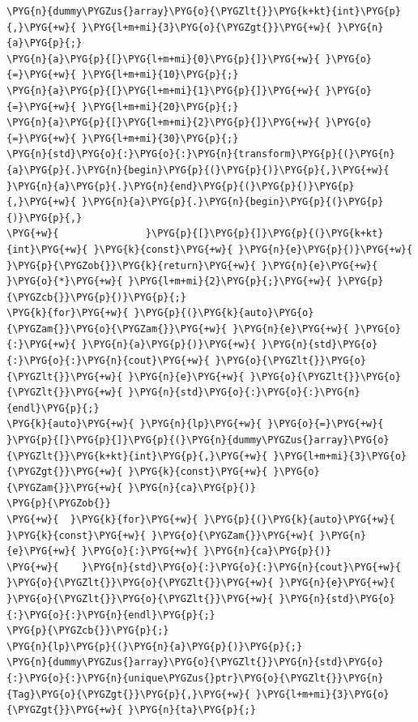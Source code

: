 \begin{codeblockbg}
\begin{Verbatim}[commandchars=\\\{\},breaklines=true,breakanywhere=true,fontsize=\codefont,xleftmargin=17bp]
\PYG{n}{dummy\PYGZus{}array}\PYG{o}{\PYGZlt{}}\PYG{k+kt}{int}\PYG{p}{,}\PYG{+w}{ }\PYG{l+m+mi}{3}\PYG{o}{\PYGZgt{}}\PYG{+w}{ }\PYG{n}{a}\PYG{p}{;}
\PYG{n}{a}\PYG{p}{[}\PYG{l+m+mi}{0}\PYG{p}{]}\PYG{+w}{ }\PYG{o}{=}\PYG{+w}{ }\PYG{l+m+mi}{10}\PYG{p}{;}
\PYG{n}{a}\PYG{p}{[}\PYG{l+m+mi}{1}\PYG{p}{]}\PYG{+w}{ }\PYG{o}{=}\PYG{+w}{ }\PYG{l+m+mi}{20}\PYG{p}{;}
\PYG{n}{a}\PYG{p}{[}\PYG{l+m+mi}{2}\PYG{p}{]}\PYG{+w}{ }\PYG{o}{=}\PYG{+w}{ }\PYG{l+m+mi}{30}\PYG{p}{;}
\PYG{n}{std}\PYG{o}{:}\PYG{o}{:}\PYG{n}{transform}\PYG{p}{(}\PYG{n}{a}\PYG{p}{.}\PYG{n}{begin}\PYG{p}{(}\PYG{p}{)}\PYG{p}{,}\PYG{+w}{ }\PYG{n}{a}\PYG{p}{.}\PYG{n}{end}\PYG{p}{(}\PYG{p}{)}\PYG{p}{,}\PYG{+w}{ }\PYG{n}{a}\PYG{p}{.}\PYG{n}{begin}\PYG{p}{(}\PYG{p}{)}\PYG{p}{,}
\PYG{+w}{               }\PYG{p}{[}\PYG{p}{]}\PYG{p}{(}\PYG{k+kt}{int}\PYG{+w}{ }\PYG{k}{const}\PYG{+w}{ }\PYG{n}{e}\PYG{p}{)}\PYG{+w}{ }\PYG{p}{\PYGZob{}}\PYG{k}{return}\PYG{+w}{ }\PYG{n}{e}\PYG{+w}{ }\PYG{o}{*}\PYG{+w}{ }\PYG{l+m+mi}{2}\PYG{p}{;}\PYG{+w}{ }\PYG{p}{\PYGZcb{}}\PYG{p}{)}\PYG{p}{;}
\PYG{k}{for}\PYG{+w}{ }\PYG{p}{(}\PYG{k}{auto}\PYG{o}{\PYGZam{}}\PYG{o}{\PYGZam{}}\PYG{+w}{ }\PYG{n}{e}\PYG{+w}{ }\PYG{o}{:}\PYG{+w}{ }\PYG{n}{a}\PYG{p}{)}\PYG{+w}{ }\PYG{n}{std}\PYG{o}{:}\PYG{o}{:}\PYG{n}{cout}\PYG{+w}{ }\PYG{o}{\PYGZlt{}}\PYG{o}{\PYGZlt{}}\PYG{+w}{ }\PYG{n}{e}\PYG{+w}{ }\PYG{o}{\PYGZlt{}}\PYG{o}{\PYGZlt{}}\PYG{+w}{ }\PYG{n}{std}\PYG{o}{:}\PYG{o}{:}\PYG{n}{endl}\PYG{p}{;}
\PYG{k}{auto}\PYG{+w}{ }\PYG{n}{lp}\PYG{+w}{ }\PYG{o}{=}\PYG{+w}{ }\PYG{p}{[}\PYG{p}{]}\PYG{p}{(}\PYG{n}{dummy\PYGZus{}array}\PYG{o}{\PYGZlt{}}\PYG{k+kt}{int}\PYG{p}{,}\PYG{+w}{ }\PYG{l+m+mi}{3}\PYG{o}{\PYGZgt{}}\PYG{+w}{ }\PYG{k}{const}\PYG{+w}{ }\PYG{o}{\PYGZam{}}\PYG{+w}{ }\PYG{n}{ca}\PYG{p}{)}
\PYG{p}{\PYGZob{}}
\PYG{+w}{  }\PYG{k}{for}\PYG{+w}{ }\PYG{p}{(}\PYG{k}{auto}\PYG{+w}{ }\PYG{k}{const}\PYG{+w}{ }\PYG{o}{\PYGZam{}}\PYG{+w}{ }\PYG{n}{e}\PYG{+w}{ }\PYG{o}{:}\PYG{+w}{ }\PYG{n}{ca}\PYG{p}{)}
\PYG{+w}{    }\PYG{n}{std}\PYG{o}{:}\PYG{o}{:}\PYG{n}{cout}\PYG{+w}{ }\PYG{o}{\PYGZlt{}}\PYG{o}{\PYGZlt{}}\PYG{+w}{ }\PYG{n}{e}\PYG{+w}{ }\PYG{o}{\PYGZlt{}}\PYG{o}{\PYGZlt{}}\PYG{+w}{ }\PYG{n}{std}\PYG{o}{:}\PYG{o}{:}\PYG{n}{endl}\PYG{p}{;}
\PYG{p}{\PYGZcb{}}\PYG{p}{;}
\PYG{n}{lp}\PYG{p}{(}\PYG{n}{a}\PYG{p}{)}\PYG{p}{;}
\PYG{n}{dummy\PYGZus{}array}\PYG{o}{\PYGZlt{}}\PYG{n}{std}\PYG{o}{:}\PYG{o}{:}\PYG{n}{unique\PYGZus{}ptr}\PYG{o}{\PYGZlt{}}\PYG{n}{Tag}\PYG{o}{\PYGZgt{}}\PYG{p}{,}\PYG{+w}{ }\PYG{l+m+mi}{3}\PYG{o}{\PYGZgt{}}\PYG{+w}{ }\PYG{n}{ta}\PYG{p}{;}

\end{Verbatim}
\end{codeblockbg}

